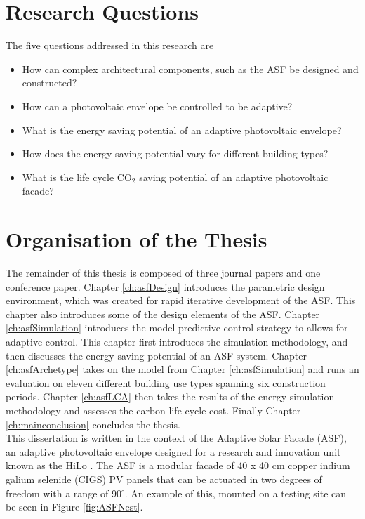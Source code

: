 \newpage

\section{Research Questions}

The five questions addressed in this research are 

\begin{itemize}
\item How can complex architectural components, such as the ASF be designed and constructed? 
\item How can a photovoltaic envelope be controlled to be adaptive?
\item What is the energy saving potential of an adaptive photovoltaic envelope?
\item How does the energy saving potential vary for different building types?
\item What is the life cycle CO$_2$ saving potential of an adaptive photovoltaic facade?

\end{itemize}

\section{Organisation of the Thesis}

The remainder of this thesis is composed of three journal papers and one conference paper. Chapter \ref{ch:asfDesign} introduces the parametric design environment, which was created for rapid iterative development of the ASF. This chapter also introduces some of the design elements of the ASF. Chapter \ref{ch:asfSimulation} introduces the model predictive control strategy to allows for adaptive control. This chapter first introduces the simulation methodology, and then discusses the energy saving potential of an ASF system. Chapter \ref{ch:asfArchetype} takes on the model from Chapter \ref{ch:asfSimulation} and runs an evaluation on eleven different building use types spanning six construction periods. Chapter \ref{ch:asfLCA} then takes the results of the energy simulation methodology and assesses the carbon life cycle cost. Finally Chapter \ref{ch:mainconclusion} concludes the thesis. \\

This dissertation is written in the context of the Adaptive Solar Facade (ASF), an adaptive photovoltaic envelope designed for a research and innovation unit known as the HiLo \cite{Block2017}. The ASF is a modular facade of 40 x 40 cm copper indium galium selenide (CIGS) PV panels that can be actuated in two degrees of freedom with a range of 90$^{\circ}$. An example of this, mounted on a testing site can be seen in Figure \ref{fig:ASFNest}.